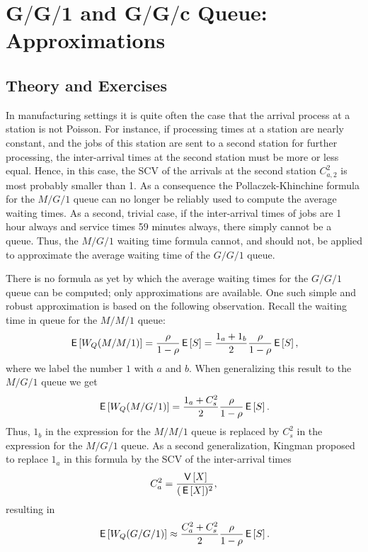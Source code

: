 \section
[$G/G/1$  and $G/G/c$ Queue: Approximations]
{$\mathbf{G/G/1}$  and $\mathbf{G/G/c}$ Queue: Approximations}
\label{sec:gg1}


\subsection*{Theory and Exercises}






In manufacturing settings it is quite often the case that the arrival
process at a station is not Poisson. For instance, if processing times
at a station are nearly constant, and the jobs of this station are
sent to a second station for further processing, the inter-arrival
times at the second station must be more or less equal. Hence, in this
case, the SCV of the arrivals at the second station $C_{a,2}^2$ is
most probably smaller than 1. As a consequence the
Pollaczek-Khinchine formula for the $M/G/1$ queue can no longer be
reliably used to compute the average waiting times.  As a second,
trivial case, if the inter-arrival times of jobs are 1 hour always and
service times 59 minutes always, there simply cannot be a queue. Thus,
the $M/G/1$ waiting time formula cannot, and should not, be applied to
approximate the average waiting time of the $G/G/1$ queue. 

There is no formula as yet by which the average waiting times for the
$G/G/1$ queue can be computed; only approximations are available. One
such simple and robust approximation is based on the following
observation. Recall  the waiting time in queue for the $M/M/1$ queue:
\begin{equation*}
  \,\mathsf{E}\left[W_Q(M/M/1)\right] = \frac{\rho}{1-\rho} \,\mathsf{E}\left[S\right] = 
\frac{1_a + 1_b}2 \frac{\rho}{1-\rho} \,\mathsf{E}\left[S\right],
\end{equation*}
where we label the number $1$ with $a$ and $b$. When generalizing this
result to the $M/G/1$ queue we get
\begin{equation*}
  \,\mathsf{E}\left[W_Q(M/G/1)\right] = \frac{1_a + C_s^2}2 \frac{\rho}{1-\rho} \,\mathsf{E}\left[S\right].
\end{equation*}
Thus, $1_b$ in the expression for the $M/M/1$ queue is replaced by
$C_s^2$ in the expression for the $M/G/1$ queue. As a second
generalization, Kingman proposed to replace $1_a$ in this formula by
the SCV of the inter-arrival times
\begin{equation*}
C_a^2 = \frac{\,\mathsf{V}\left[X\right]}{(\,\mathsf{E}\left[X\right])^2},
\end{equation*}
resulting in
\begin{equation*}
  \,\mathsf{E}\left[W_Q(G/G/1)\right] \approx \frac{C_a^2 + C_s^2}2 \frac{\rho}{1-\rho} \,\mathsf{E}\left[S\right].
\end{equation*}


